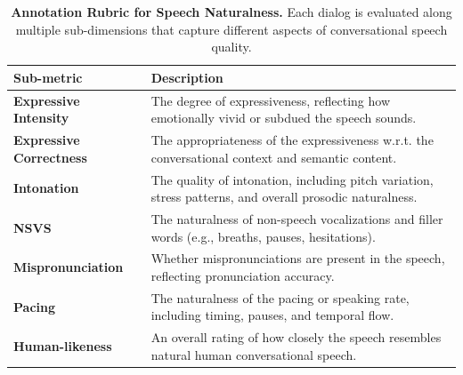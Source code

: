 \begin{table}[!t]
\centering
\footnotesize
\renewcommand{\arraystretch}{1}  %
\setlength{\tabcolsep}{9pt}
\captionsetup{font=small}

\caption{\textbf{Annotation Rubric for Speech Naturalness.}
Each dialog is evaluated along multiple sub-dimensions that capture different aspects of conversational speech quality.}
\vspace{-0.6em}

\begin{tabular}{p{3.2cm} p{12.2cm}}
\toprule
\textbf{Sub-metric} & \textbf{Description} \\
\midrule
\textbf{Expressive Intensity} &
The degree of expressiveness, reflecting how emotionally vivid or subdued the speech sounds. \\

\textbf{Expressive Correctness} &
The appropriateness of the expressiveness w.r.t. the conversational context and semantic content. \\

\textbf{Intonation} &
The quality of intonation, including pitch variation, stress patterns, and overall prosodic naturalness. \\

\textbf{NSVS}&
The naturalness of non-speech vocalizations and filler words (e.g., breaths, pauses, hesitations). \\

\textbf{Mispronunciation} &
Whether mispronunciations are present in the speech, reflecting pronunciation accuracy. \\

\textbf{Pacing} &
The naturalness of the pacing or speaking rate, including timing, pauses, and temporal flow. \\

\midrule
\textbf{Human-likeness} &
An overall rating of how closely the speech resembles natural human conversational speech. \\
\bottomrule
\end{tabular}
\label{table:rubric}
\vspace{-1em}
\end{table}
